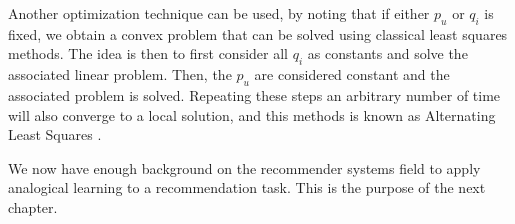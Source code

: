Another optimization technique can be used, by noting that if either $p_u$ or
$q_i$ is fixed, we obtain a convex problem that can be solved using
classical least squares methods. The idea is then to first consider all $q_i$
as constants and solve the associated linear problem. Then, the $p_u$ are
considered constant and the associated problem is solved. Repeating these steps
an arbitrary number of time will also converge to a local solution, and this
methods is known as Alternating Least Squares \cite{BelKor07}.

We now have enough background on the recommender systems field to apply
analogical learning to a recommendation task. This is the purpose of the next
chapter.
